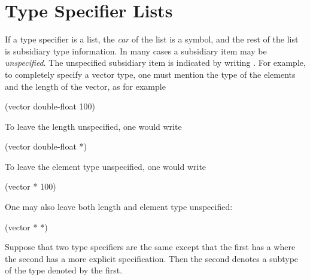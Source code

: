 \section{Type Specifier Lists}

If a type specifier is a list, the {\it car}
of the list is a symbol, and the rest of the list is subsidiary
type information.  In many cases a subsidiary item may be
{\it unspecified}.  The unspecified subsidiary item is indicated
by writing \cd{*}.  For example, to completely specify
a vector type, one must mention the type of the elements
and the length of the vector, as for example
\begin{lisp}
(vector double-float 100)
\end{lisp}
To leave the length unspecified, one would write
\begin{lisp}
(vector double-float *)
\end{lisp}
To leave the element type unspecified, one would write
\begin{lisp}
(vector * 100)
\end{lisp}
\begin{newer}
\noindent
One may also leave both length and element type unspecified:
\begin{lisp}
(vector * *)
\end{lisp}
\end{newer}
Suppose that two type specifiers are the same except that the first
has a \cd{*} where the second has a more explicit specification.
Then the second denotes a subtype of the type denoted by the first.

